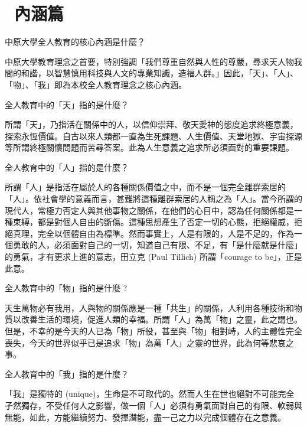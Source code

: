\section{~內涵篇}
\label{se:se3}
中原大學全人教育的核心內涵是什麼？ 
\par
中原大學教育理念之首要，特別強調「我們尊重自然與人性的尊嚴，尋求天人物我間的和諧，以智慧慎用科技與人文的專業知識，造福人群。」因此，「天」、「人」、「物」、「我」即為本校全人教育理念之核心內涵。
\par
全人教育中的「天」指的是什麼？ 
\par
所謂「天」，乃指活在關係中的人，以信仰崇拜、敬天愛神的態度追求終極意義，探索永恆價值。自古以來人類都一直為生死課題、人生價值、天堂地獄、宇宙探源等所謂終極關懷問題而苦尋答案。此為人生意義之追求所必須面對的重要課題。 
\par
全人教育中的「人」指的是什麼？ 
\par
所謂「人」是指活在屬於人的各種關係價值之中，而不是一個完全離群索居的「人」。依社會學的意義而言，甚難將這種離群索居的人稱之為「人」。當今所謂的現代人，常極力否定人與其他事物之關係，在他們的心目中，認為任何關係都是一種束縛，都是對個人自由的斲傷。這種思想產生了否定一切的心態，拒絕權威，拒絕真理，完全以個體自由為標準。然而事實上，人是有限的，人是不足的，作為一個勇敢的人，必須面對自己的一切，知道自己有限、不足，有「是什麼就是什麼」的勇氣，才有更求上進的意志，田立克 (Paul Tillich) 所謂「courage to be」，正是此意。 
\par
全人教育中的「物」指的是什麼 ? 
\par
天生萬物必有我用，人與物的關係應是一種「共生」的關係，人利用各種技術和物質以改善生活的環境，促進人類的幸福。所謂「人」為萬「物」之靈，此之謂也。但是，不幸的是今天的人已為「物」所役，甚至與「物」相對峙，人的主體性完全喪失，今天的世界似乎已是追求「物」為萬「人」之靈的世界，此為何等悲哀之事。
\par 
 全人教育中的「我」指的是什麼？
 \par 
「我」是獨特的 (unique)，生命是不可取代的。然而人生在世也絕對不可能完全孑然獨存，不受任何人之影響，做一個「人」必須有勇氣面對自己的有限、軟弱與無能，如此，方能繼續努力、發揮潛能，盡一己之力以完成個體存在之意義。
